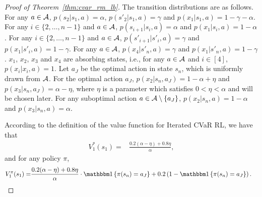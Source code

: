 \begin{proof}[Proof of Theorem~\ref{thm:cvar_rm_lb}]
	The transition distributions are as follows.
	For any $a \in \mathcal{A}$, $p(s_2|s_1,a)=\alpha$, $p(s'_2|s_1,a)=\gamma$ and $p(x_1|s_1,a)=1-\gamma-\alpha$.
	For any $i\in\{2,\dots,n-1\}$ and $a \in \mathcal{A}$,
	$p(s_{i+1}|s_i,a)=\alpha$ and $p(x_1|s_i,a)=1-\alpha$.
	For any $i\in\{2,\dots,n-1\}$ and $a \in \mathcal{A}$,
	$p(s'_{i+1}|s'_i,a)=\gamma$ and $p(x_1|s'_i,a)=1-\gamma$.
	For any $a \in \mathcal{A}$, $p(x_4|s'_n,a)=\gamma$ and $p(x_1|s'_n,a)=1-\gamma$.
	$x_1$, $x_2$, $x_3$ and $x_4$ are absorbing states, i.e., for any $a \in \mathcal{A}$ and $i \in [4]$, $p(x_i|x_i,a)=1$.
	Let $a_{J}$ be the optimal action in state $s_n$, which is uniformly drawn from $\mathcal{A}$.
	For the optimal action $a_J$, $p(x_2|s_n,a_{J})=1-\alpha+\eta$ and $p(x_3|s_n,a_{J})=\alpha-\eta$, where $\eta$ is a parameter which satisfies $0<\eta<\alpha$ and will be chosen later.
	For any suboptimal action $a \in \mathcal{A} \setminus \{a_{J}\}$,
	$p(x_2|s_n,a)=1-\alpha$ and $p(x_3|s_n,a)=\alpha$.
	
	
	According to the definition of the value function for Iterated CVaR RL,
	we have that
	\begin{align*}
		V^{*}_1(s_1) = &  \frac{0.2 (\alpha-\eta) +0.8 \eta }{\alpha} ,
	\end{align*}
	and for any policy $\pi$,
	\begin{align*}
		V^{\pi}_1(s_1) = &  \frac{0.2 (\alpha-\eta) +0.8 \eta }{\alpha} \cdot \indicator{\pi(s_n)=a_{J}} +   0.2 \sbr{1-\indicator{\pi(s_n)=a_{J}}} .
	\end{align*}
	

\end{proof}
